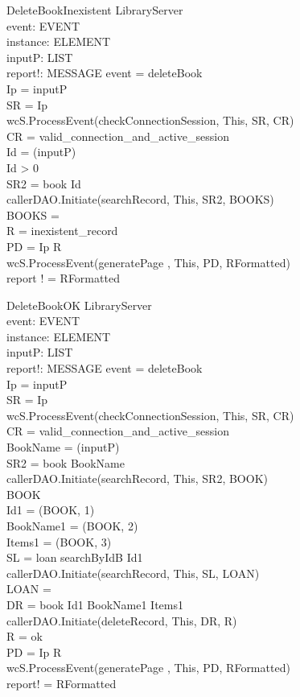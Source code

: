 \begin{schema}{DeleteBookInexistent}
\Delta LibraryServer \\
event: EVENT \\
instance: ELEMENT \\
inputP: LIST \\
report!: MESSAGE
\where event = deleteBook \\
Ip = \head inputP \\
SR = \lseq Ip \rseq \\ 
wcS.ProcessEvent(checkConnectionSession, This, SR, CR) \\
CR = valid\_connection\_and\_active\_session \\
Id = \head (\tail inputP) \\
Id > 0 \\
SR2 = \lseq book Id \rseq \\
callerDAO.Initiate(searchRecord, This, SR2, BOOKS) \\
BOOKS = \emptyset \\
R = inexistent\_record \\
PD = \lseq Ip R \rseq \\
wcS.ProcessEvent(generatePage , This, PD, RFormatted) \\
report ! = RFormatted
\end{schema}

\begin{schema}{DeleteBookOK}
\Delta LibraryServer \\
event: EVENT \\
instance: ELEMENT \\
inputP: LIST \\
report!: MESSAGE
\where event = deleteBook \\
Ip = \head inputP \\
SR = \lseq Ip \rseq \\ 
wcS.ProcessEvent(checkConnectionSession, This, SR, CR) \\
CR = valid\_connection\_and\_active\_session \\
BookName = \head (\tail inputP) \\
SR2 = \lseq book BookName \rseq \\
callerDAO.Initiate(searchRecord, This, SR2, BOOK) \\
BOOK \neq \emptyset \\
Id1 = \nth(\head BOOK, 1) \\
BookName1 = \nth(\head BOOK, 2) \\
Items1 = \nth(\head BOOK, 3) \\ 
SL = \lseq loan searchByIdB Id1 \rseq \\
callerDAO.Initiate(searchRecord, This, SL, LOAN) \\
LOAN = \emptyset \\
DR = \lseq book Id1 BookName1 Items1 \rseq \\
callerDAO.Initiate(deleteRecord, This, DR, R) \\
R = ok \\
PD = \lseq Ip R \rseq \\
wcS.ProcessEvent(generatePage , This, PD, RFormatted) \\
report! = RFormatted 
\end{schema}

